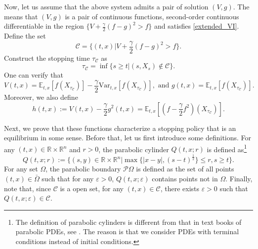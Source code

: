 \documentclass[11pt]{article}
\begin{document}
Now, let us assume that the above system admits a pair of solution $(V,g)$. The means that $(V,g)$ is a pair of continuous functions, second-order continuous differentiable in the region $\{V+\frac{\gamma}{2}(f-g)^2>f\}$ and satisfies \eqref{extended_VI}. Define  the set 
$$
\mathcal C=\{(t,x)| V+\frac{\gamma}{2}(f-g)^2>f\}.
$$
Construct the stopping time $\tau_{\mathcal C}$ as 
$$
\tau_{\mathcal C}=\inf\{s\ge t| (s,X_s) \notin \mathcal C\}.
$$
One can verify that 
$$
V(t,x)=\mathbb E_{t,x}\left[f(X_{\tau_{\mathcal C}})\right]-\frac\gamma2\text{Var}_{t,x}\left[f(X_{\tau_{\mathcal C}})\right], \text{ and } g(t,x)=\mathbb E_{t,x}\left[f(X_{\tau_{\mathcal C}})\right].
$$
Moreover, we also define 
$$
h(t,x):=V(t,x)-\frac{\gamma}{2}g^2(t,x)=\mathbb E_{t,x}\left[(f-\frac{\gamma}{2}f^2)(X_{\tau_{\mathcal C}})\right].$$

Next, we prove that these functions characterize a stopping policy that is an equilibrium in some sense. Before that, let us first introduce some definitions. For any $(t,x)\in \mathbb R \times\mathbb R^n$ and $r>0$, the parabolic cylinder $Q(t,x;r)$ is defined as\footnote{The definition of parabolic cylinders is different from that in text books of parabolic PDEs, see \cite{lieberman1996second}. The reason is that we consider PDEs with terminal conditions instead of initial conditions.} 
$$
Q(t,x;r):=\{(s,y)\in \mathbb R \times\mathbb R^n| \max\{|x-y|,(s-t)^{\frac12}\} \le r,s\ge t\}.
$$
For any set $\Omega$, the parabolic boundary $\mathcal P \Omega$ is defined as the set of all points $(t,x) \in \bar \Omega$ such that for any $\varepsilon>0$, $Q(t,x;\varepsilon)$ contains points not in $\Omega$. Finally, note that, since $\mathcal C$ is a open set, for any $(t,x) \in \mathcal C$, there exists $\varepsilon>0$ such that $Q(t,x;\varepsilon) \in \mathcal C$. 
\end{document}

